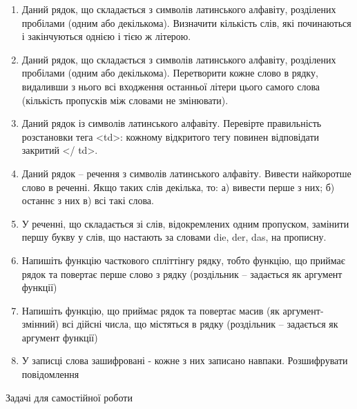 \documentclass[]{article}
\makeatletter
\newcommand{\xslalph}[1]{\expandafter\@xslalph\csname c@#1\endcsname}
\newcommand{\@xslalph}[1]{%
    \ifcase#1\or а\or б\or в\or г\or д\or e\or є\or ж\or з\or i%
    \or й\or к\or л\or м\or н\or о\or п\or р\or с\or т%
    \or у\or ф\or х\or ц\or ч\or ш\or ю\or я\or аа\or бб\or вв%
    \else\@ctrerr\fi%
}
\makeatother
\begin{document}
\begin{enumerate}
\begin{enumerate}[label=\xslalph*)]
\begin{enumerate}
\begin{enumerate}[label=\xslalph*)]
\begin{enumerate}
\def\labelenumi{\arabic{enumi})}
\item
  Даний рядок, що складається з символів латинського алфавіту,
  розділених пробілами (одним або декількома). Визначити кількість слів,
  які починаються і закінчуються однією і тією ж літерою.
\item
  Даний рядок, що складається з символів латинського алфавіту,
  розділених пробілами (одним або декількома). Перетворити кожне слово в
  рядку, видаливши з нього всі входження останньої літери цього самого
  слова (кількість пропусків між словами не змінювати).
\item
  Даний рядок із символів латинського алфавіту. Перевірте правильність
  розстановки тега \textless{}td\textgreater{}: кожному відкритого тегу
  повинен відповідати закритий \textless{}/ td\textgreater{}.
\item
  Даний рядок -- речення з символів латинського алфавіту. Вивести
  найкоротше слово в реченні. Якщо таких слів декілька, то: 
  а) вивести перше з них; б) останнє з них в) всі такі слова.
\item
  У реченні, що складається зі слів, відокремлених одним пропуском,
  замінити першу букву у слів, що настають за словами die, der, das, на
  прописну.
\item
  Напишіть функцію часткового спліттінгу рядку, тобто функцію, що
  приймає рядок та повертає перше слово з рядку (роздільник -- задається
  як аргумент функції)
\item
  Напишіть функцію, що приймає рядок та повертає масив (як
  аргумент-змінний) всі дійсні числа, що містяться в рядку (роздільник
  -- задається як аргумент функції)
\item
  У записці слова зашифровані - кожне з них записано навпаки.
  Розшифрувати повідомлення
\end{enumerate}

Задачі для самостійної роботи


\end{enumerate}
\end{enumerate}
\end{enumerate}
\end{enumerate}
\end{document}
